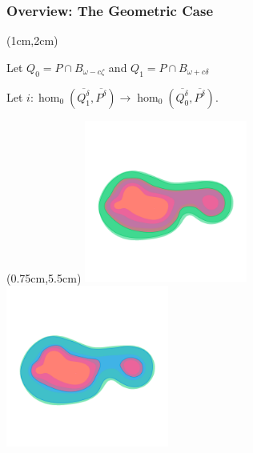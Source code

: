 \begin{frame}
  \frametitle{Overview: The Geometric Case}
  \begin{textblock*}{11cm}(1cm,2cm)
  \begin{small}
    Let $Q_0 = P\cap B_{\omega-c\zeta}$ and $Q_1 = P\cap B_{\omega+c\delta}$\vspace{1ex}

    Let $i : \hom_0(\overline{Q_1^\delta}, \overline{P^\delta})\to \hom_0(\overline{Q_0^\delta}, \overline{P^\delta})$.

  \end{small}
  \end{textblock*}

  \begin{textblock*}{12cm}(0.75cm,5.5cm)
    \includegraphics[trim=50 250 50 300, clip, width=0.4\textwidth]{figures/nbhd/PQ0}\hspace{6ex}
    \includegraphics[trim=50 250 50 300, clip, width=0.4\textwidth]{figures/nbhd/PQ1}
  \end{textblock*}
\end{frame}

